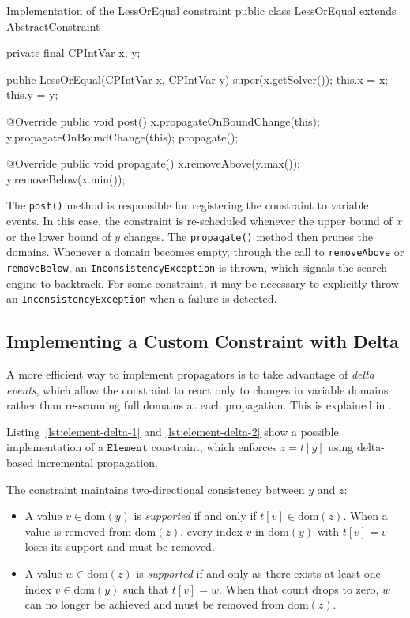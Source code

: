 \documentclass[11pt, a4paper]{scrartcl}
\begin{document}
\begin{codebox}[label={lst:custom-constraint}]{Implementation of the LessOrEqual constraint}
public class LessOrEqual extends AbstractConstraint {
    private final CPIntVar x, y;

    public LessOrEqual(CPIntVar x, CPIntVar y) {
        super(x.getSolver());
        this.x = x; this.y = y;
    }

    @Override
    public void post() {
        x.propagateOnBoundChange(this);
        y.propagateOnBoundChange(this);
        propagate();
    }

    @Override
    public void propagate() {
        x.removeAbove(y.max());
        y.removeBelow(x.min());
    }
}
\end{codebox}

The \texttt{post()} method is responsible for registering the constraint to variable events.
In this case, the constraint is re-scheduled whenever the upper bound of $x$ or the lower bound of $y$ changes.
The \texttt{propagate()} method then prunes the domains.
Whenever a domain becomes empty, through the call to \texttt{removeAbove} or \texttt{removeBelow},
an \texttt{InconsistencyException} is thrown, which signals the search engine to backtrack.
For some constraint, it may be necessary to explicitly throw an \texttt{InconsistencyException} when a failure is detected.

\subsection{Implementing a Custom Constraint with Delta}

A more efficient way to implement propagators is to take advantage of \textit{delta events},
which allow the constraint to react only to changes in variable domains rather
than re-scanning full domains at each propagation.
This is explained in \cite{sparsets2013domain}.

Listing~\ref{lst:element-delta-1} and \ref{lst:element-delta-2} show a possible implementation of a $\texttt{Element}$ constraint,
which enforces $z = t[y]$ using delta-based incremental propagation.

The constraint maintains two-directional consistency between $y$ and $z$:
\begin{itemize}
    \item A value $v \in \mathrm{dom}(y)$ is \emph{supported} if and only if $t[v] \in \mathrm{dom}(z)$.
          When a value is removed from $\mathrm{dom}(z)$, every index $v$ in $\mathrm{dom}(y)$ with $t[v] = v$ loses its support and must be removed.
    \item A value $w \in \mathrm{dom}(z)$ is \emph{supported} if and only as there exists at least one index $v \in \mathrm{dom}(y)$ such that $t[v] = w$.
          When that count drops to zero, $w$ can no longer be achieved and must be removed from $\mathrm{dom}(z)$.
\end{itemize}
\end{document}
